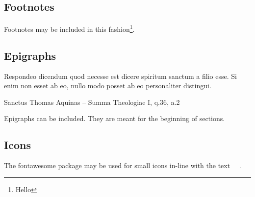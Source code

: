 \subsection{Footnotes}
Footnotes may be included in this fashion\footnote{Hello}.

\subsection{Epigraphs}
\epigraph{Respondeo dicendum quod necesse est dicere spiritum sanctum a filio
esse. Si enim non esset ab eo, nullo modo posset ab eo personaliter distingui.}
{Sanctus Thomas Aquinas -- Summa Theologiae I, q.36, a.2}

Epigraphs can be included. They are meant for the beginning of sections.

\subsection{Icons}
The fontawesome package \cite{fontawesome-latex} may be used for small icons
in-line with the text \faSmileO~\faMedkit~\faBicycle.

